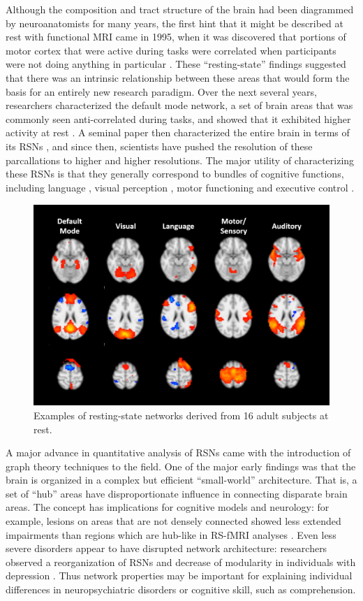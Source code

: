 Although the composition and tract structure of the brain had been diagrammed by neuroanatomists for many years, the first hint that it might be described at rest with functional MRI came in 1995, when it was discovered that portions of motor cortex that were active during tasks were correlated when participants were not doing anything in particular \citep{Biswal1995}. These ``resting-state'' findings suggested that there was an intrinsic relationship between these areas that would form the basis for an entirely new research paradigm. Over the next several years, researchers characterized the default mode network, a set of brain areas that was commonly seen anti-correlated during tasks, and showed that it exhibited higher activity at rest \citep{Greicius2003}. A seminal paper then characterized the entire brain in terms of its RSNs \citep{Yeo2011}, and since then, scientists have pushed the resolution of these parcallations to higher and higher resolutions. The major utility of characterizing these RSNs is that they generally correspond to bundles of cognitive functions, including language \citep{Cordes2000, Hampson2002}, visual perception \citep{Simmons2012}, motor functioning \citep{Biswal1995} and executive control \citep{Seeley2007}. 

\begin{figure}[t]
    \centering
    \includegraphics[height=3in]{images/ch1-ica.png}
    \caption[Examples of resting-state networks.]{Examples of resting-state networks derived from 16 adult subjects at rest.}
    \label{fig:ch1-ica}
\end{figure}

A major advance in quantitative analysis of RSNs came with the introduction of graph theory techniques to the field. One of the major early findings was that the brain is organized in a complex but efficient ``small-world'' architecture. That is, a set of ``hub'' areas have disproportionate influence in connecting disparate brain areas. The concept has implications for cognitive models and neurology: for example, lesions on areas that are not densely connected showed less extended impairments than regions which are hub-like in RS-fMRI analyses \citep{Warren2014}. Even less severe disorders appear to have disrupted network architecture: researchers observed a reorganization of RSNs and decrease of modularity in individuals with depression \citep{Lord2012}. Thus network properties may be important for explaining individual differences in neuropsychiatric disorders or cognitive skill, such as comprehension.

